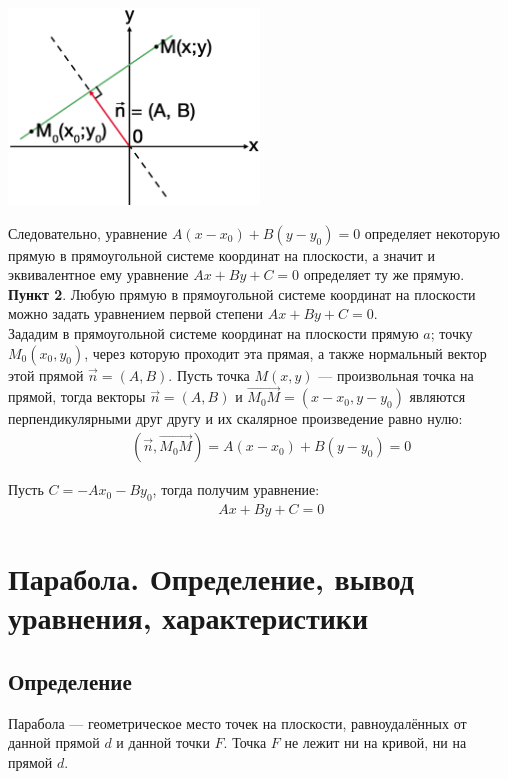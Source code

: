 \documentclass[12pt, fleqn]{extarticle}
\begin{document}
\begin{center}
    \includegraphics[width=0.5\textwidth]{general_line.png}
\end{center}

Следовательно, уравнение \(A(x - x_0) + B(y - y_0) = 0\) определяет некоторую прямую в прямоугольной системе координат на плоскости, а значит и эквивалентное ему уравнение \(Ax + By + C = 0\) определяет ту же прямую. \\

\textbf{Пункт 2}. Любую прямую в прямоугольной системе координат на плоскости можно задать уравнением первой степени \(Ax + By + C = 0\). \\

Зададим в прямоугольной системе координат на плоскости прямую \(a \); точку \(M_0(x_0, y_0)\), через которую проходит эта прямая, а также нормальный вектор этой прямой \(\overrightarrow{n} = (A, B)\).
Пусть точка \(M(x, y)\) — произвольная точка на прямой, тогда векторы \(\overrightarrow{n} = (A, B)\) и \(\overrightarrow{M_0M} = (x - x_0, y - y_0)\) являются перпендикулярными друг другу и их скалярное произведение равно нулю:
\begin{align*}
     &  &
    (\overrightarrow{n}, \overrightarrow{M_0M}) = A(x - x_0) + B(y - y_0) = 0
\end{align*}

Пусть \(C = -Ax_0 - By_0\), тогда получим уравнение:
\begin{align*}
     &  &
    Ax + By + C = 0
\end{align*}



\newpage

\section{Парабола. Определение, вывод уравнения, характеристики}\label{sec:parabola}

\subsection*{Определение}
Парабола — геометрическое место точек на плоскости, равноудалённых от данной прямой \(d\) и данной точки \(F\).
Точка \(F\) не лежит ни на кривой, ни на прямой \(d\).
\end{document}
